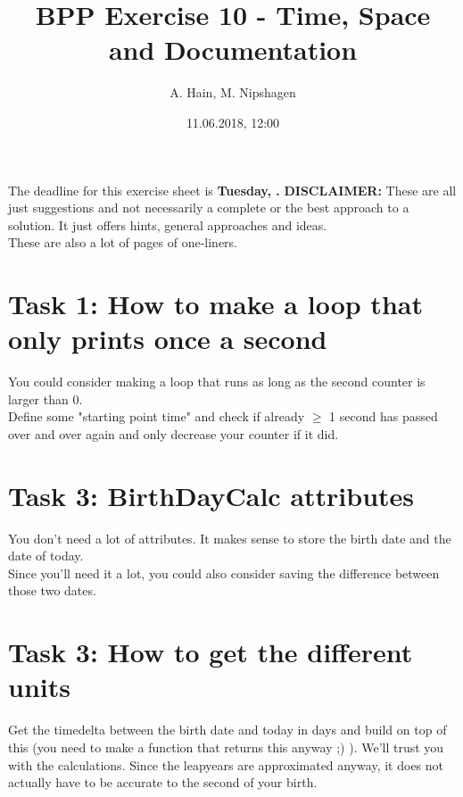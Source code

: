 

\title{BPP Exercise 10 - Time, Space and Documentation}
\author{A. Hain, M. Nipshagen}
\date{11.06.2018, 12:00}

\makeatletter
\let\thetitle\@title
\let\theauthor\@author
\let\thedate\@date
\makeatother

\newcommand\itemsub[1]{
	\begin{itemize}
		\item #1
	\end{itemize}
}

\setcounter{secnumdepth}{0}


The deadline for this exercise sheet is \textbf{Tuesday, \thedate.}
\tableofcontents
\vspace{12pt}\noindent
\textbf{DISCLAIMER:} These are all just suggestions and not necessarily a complete
or the best approach to a solution. It just offers hints, general approaches
and ideas.\\
These are also a lot of pages of one-liners.
\pagebreak

\section{Task 1: How to make a loop that only prints once a second}
You could consider making a loop that runs as long as the second counter is larger than 0.\\
Define some "starting point time" and check if already $\geq$ 1 second has passed over and
over again and only decrease your counter if it did.

\pagebreak

\section{Task 3: BirthDayCalc attributes}
You don't need a lot of attributes. It makes sense to store the birth date and
the date of today.\\
Since you'll need it a lot, you could also consider saving the difference between
those two dates.

\pagebreak

\section{Task 3: How to get the different units}
Get the timedelta between the birth date and today in days and build on top of this
(you need to make a function that returns this anyway ;) ). We'll trust you with
the calculations. Since the leapyears are approximated anyway, it does not actually
have to be accurate to the second of your birth.


